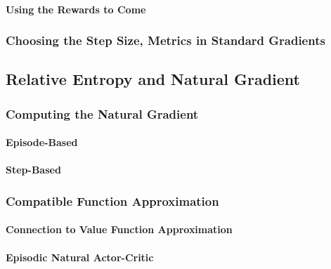 				\paragraph{Using the Rewards to Come} %

			\subsubsection{Choosing the Step Size, Metrics in Standard Gradients} %

		\subsection{Relative Entropy and Natural Gradient} %

			\subsubsection{Computing the Natural Gradient} %

				\paragraph{Episode-Based} %

				\paragraph{Step-Based} %

			\subsubsection{Compatible Function Approximation} %

				\paragraph{Connection to Value Function Approximation} %

				\paragraph{Episodic Natural Actor-Critic} %

